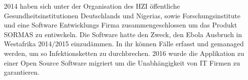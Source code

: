 2014 haben sich unter der Organisation des \ac{HZI} öffentliche Gesundheitsinstitutionen Deutschlands und Nigerias, sowie Forschungsinstitute und eine Software Entwicklungs Firma zusammengeschlossen um das Produkt \ac{SORMAS} zu entiwckeln.
Die Software hatte den Zweck, den Ebola Ausbruch in Westafrika 2014/2015 einzudämmen.
In ihr können Fälle erfasst und gemanaged werden, um so Infektionsketten zu durchbrechen.
2016 wurde die Applikation zu einer Open Source Software migriert um die Unabhängigkeit von IT Firmen zu garantieren.
\cite{SORMAS_history}